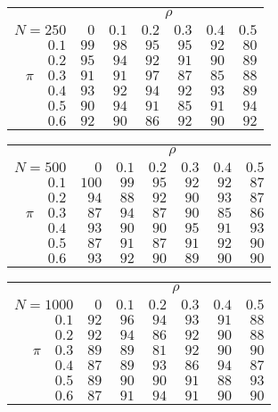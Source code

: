 \begin{tabular}{r|rrrrrr}
\hline\hline
 &\multicolumn{6}{c}{$\rho$} \\ 
 $N = 250$ & $0$ & $0.1$ & $0.2$ & $0.3$ & $0.4$ & $0.5$ \\ 
 \hline$0.1$ & $99$ & $98$ & $95$ & $95$ & $92$ & $80$\\ 
$0.2$ & $95$ & $94$ & $92$ & $91$ & $90$ & $89$\\ 
$\pi\quad$$0.3$ & $91$ & $91$ & $97$ & $87$ & $85$ & $88$\\ 
$0.4$ & $93$ & $92$ & $94$ & $92$ & $93$ & $89$\\ 
$0.5$ & $90$ & $94$ & $91$ & $85$ & $91$ & $94$\\ 
$0.6$ & $92$ & $90$ & $86$ & $92$ & $90$ & $92$\\ 
 \hline 
 \end{tabular}
 
 \vspace{2em} 
 
\begin{tabular}{r|rrrrrr}
\hline\hline
 &\multicolumn{6}{c}{$\rho$} \\ 
 $N = 500$ & $0$ & $0.1$ & $0.2$ & $0.3$ & $0.4$ & $0.5$ \\ 
 \hline$0.1$ & $100$ & $99$ & $95$ & $92$ & $92$ & $87$\\ 
$0.2$ & $94$ & $88$ & $92$ & $90$ & $93$ & $87$\\ 
$\pi\quad$$0.3$ & $87$ & $94$ & $87$ & $90$ & $85$ & $86$\\ 
$0.4$ & $93$ & $90$ & $90$ & $95$ & $91$ & $93$\\ 
$0.5$ & $87$ & $91$ & $87$ & $91$ & $92$ & $90$\\ 
$0.6$ & $93$ & $92$ & $90$ & $89$ & $90$ & $90$\\ 
 \hline 
 \end{tabular}
 
 \vspace{2em} 
 
\begin{tabular}{r|rrrrrr}
\hline\hline
 &\multicolumn{6}{c}{$\rho$} \\ 
 $N = 1000$ & $0$ & $0.1$ & $0.2$ & $0.3$ & $0.4$ & $0.5$ \\ 
 \hline$0.1$ & $92$ & $96$ & $94$ & $93$ & $91$ & $88$\\ 
$0.2$ & $92$ & $94$ & $86$ & $92$ & $90$ & $88$\\ 
$\pi\quad$$0.3$ & $89$ & $89$ & $81$ & $92$ & $90$ & $90$\\ 
$0.4$ & $87$ & $89$ & $93$ & $86$ & $94$ & $87$\\ 
$0.5$ & $89$ & $90$ & $90$ & $91$ & $88$ & $93$\\ 
$0.6$ & $87$ & $91$ & $94$ & $91$ & $90$ & $90$\\ 
 \hline 
 \end{tabular}